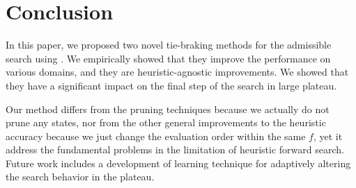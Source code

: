 \section{Conclusion}

In this paper, we proposed two novel tie-braking methods for the admissible search using \astar. We empirically showed that they improve the performance on various domains, and they are heuristic-agnostic improvements. We showed that they have a significant impact on the final step of the search in large plateau.

Our method differs from the pruning techniques because we actually
do not prune any states, nor from the other general improvements to the
heuristic accuracy because we just change the evaluation order within the
same $f$, yet it address the fundamental problems in the limitation of
heuristic forward search.  Future work includes a development of learning
technique for adaptively altering the search behavior in the plateau.




